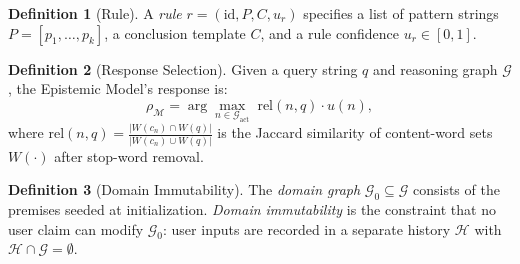 \documentclass[12pt]{article}
\theoremstyle{definition}
\newtheorem{definition}{Definition}
\begin{document}
\begin{definition}[Rule]
A \emph{rule} $r = (\mathrm{id}, P, C, u_r)$ specifies
a list of pattern strings $P = [p_1,\ldots,p_k]$,
a conclusion template $C$,
and a rule confidence $u_r \in [0,1]$.
\end{definition}

\begin{definition}[Response Selection]
\label{def:selection}
Given a query string $q$ and reasoning graph $\mathcal{G}$, the
Epistemic Model's response is:
\[
  \rho_{\mathcal{M}} = \arg\max_{n \in \mathcal{G}_{\text{act}}}
  \;\mathrm{rel}(n, q) \cdot u(n),
\]
where $\mathrm{rel}(n, q) = \frac{|W(c_n) \cap W(q)|}{|W(c_n) \cup W(q)|}$
is the Jaccard similarity of content-word sets $W(\cdot)$
after stop-word removal.
\end{definition}

\begin{definition}[Domain Immutability]
\label{def:immutability}
The \emph{domain graph} $\mathcal{G}_0 \subseteq \mathcal{G}$ consists
of the premises seeded at initialization. \emph{Domain immutability}
is the constraint that no user claim can modify $\mathcal{G}_0$:
user inputs are recorded in a separate history
$\mathcal{H}$ with $\mathcal{H} \cap \mathcal{G} = \emptyset$.
\end{definition}
\end{document}
